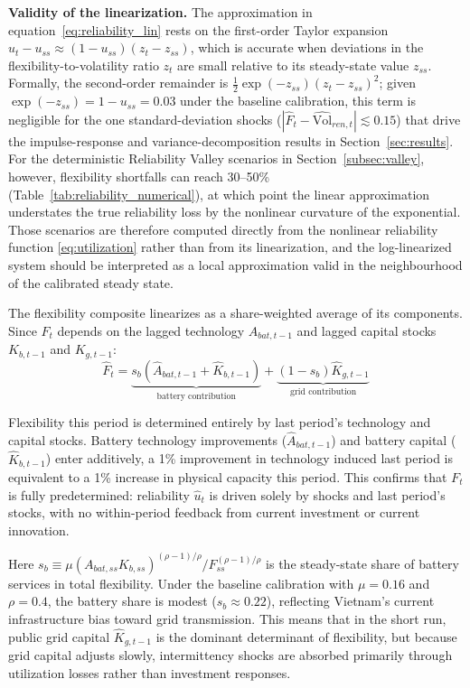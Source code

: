 \documentclass[12pt, a4paper]{article}
\begin{document}
	\noindent \textbf{Validity of the linearization.} The approximation in equation~\eqref{eq:reliability_lin} rests on the first-order Taylor expansion $u_t - u_{ss} \approx (1-u_{ss})(z_t - z_{ss})$, which is accurate when deviations in the flexibility-to-volatility ratio $z_t$ are small relative to its steady-state value $z_{ss}$. Formally, the second-order remainder is $\frac{1}{2}\exp(-z_{ss})(z_t - z_{ss})^2$; given $\exp(-z_{ss}) = 1 - u_{ss} = 0.03$ under the baseline calibration, this term is negligible for the one standard-deviation shocks ($|\hat{F}_t - \hat{\text{Vol}}_{ren,t}| \lesssim 0.15$) that drive the impulse-response and variance-decomposition results in Section~\ref{sec:results}. For the deterministic Reliability Valley scenarios in Section~\ref{subsec:valley}, however, flexibility shortfalls can reach 30--50\% (Table~\ref{tab:reliability_numerical}), at which point the linear approximation understates the true reliability loss by the nonlinear curvature of the exponential. Those scenarios are therefore computed directly from the nonlinear reliability function \eqref{eq:utilization} rather than from its linearization, and the log-linearized system should be interpreted as a local approximation valid in the neighbourhood of the calibrated steady state.
	
	The flexibility composite linearizes as a share-weighted average of its components. Since $F_t$ depends on the lagged technology $A_{bat,t-1}$ and lagged capital stocks $K_{b,t-1}$ and $K_{g,t-1}$:
	\begin{equation}
		\hat{F}_t = \underbrace{s_b \left(\hat{A}_{bat,t-1} + \hat{K}_{b,t-1}\right)}_{\text{battery contribution}} + \underbrace{(1 - s_b) \hat{K}_{g,t-1}}_{\text{grid contribution}}
		\label{eq:flex_lin}
	\end{equation}
	
	Flexibility this period is determined entirely by last period's technology and capital stocks. Battery technology improvements ($\hat{A}_{bat,t-1}$) and battery capital ($\hat{K}_{b,t-1}$) enter additively, a 1\% improvement in technology induced last period is equivalent to a 1\% increase in physical capacity this period. This confirms that $F_t$ is fully predetermined: reliability $\hat{u}_t$ is driven solely by shocks and last period's stocks, with no within-period feedback from current investment or current innovation.
	
	Here $s_b \equiv \mu (A_{bat,ss} K_{b,ss})^{(\rho-1)/\rho} / F_{ss}^{(\rho-1)/\rho}$ is the steady-state share of battery services in total flexibility. Under the baseline calibration with $\mu = 0.16$ and $\rho = 0.4$, the battery share is modest ($s_b \approx 0.22$), reflecting Vietnam's current infrastructure bias toward grid transmission. This means that in the short run, public grid capital $\hat{K}_{g,t-1}$ is the dominant determinant of flexibility, but because grid capital adjusts slowly, intermittency shocks are absorbed primarily through utilization losses rather than investment responses.
	
\end{document}
